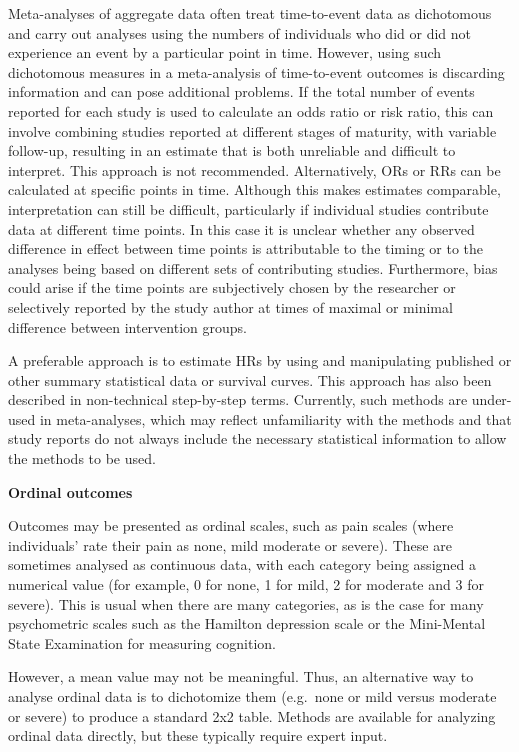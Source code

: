 \documentclass[
  10pt,
  a4paper,
  DIV=11,
  numbers=noendperiod]{scrreprt}
\begin{document}
Meta-analyses of aggregate data often treat time-to-event data as
dichotomous and carry out analyses using the numbers of individuals who
did or did not experience an event by a particular point in time.
However, using such dichotomous measures in a meta-analysis of
time-to-event outcomes is discarding information and can pose additional
problems. If the total number of events reported for each study is used
to calculate an odds ratio or risk ratio, this can involve combining
studies reported at different stages of maturity, with variable
follow-up, resulting in an estimate that is both unreliable and
difficult to interpret. This approach is not recommended. Alternatively,
ORs or RRs can be calculated at specific points in time. Although this
makes estimates comparable, interpretation can still be difficult,
particularly if individual studies contribute data at different time
points. In this case it is unclear whether any observed difference in
effect between time points is attributable to the timing or to the
analyses being based on different sets of contributing studies.
Furthermore, bias could arise if the time points are subjectively chosen
by the researcher or selectively reported by the study author at times
of maximal or minimal difference between intervention groups.

A preferable approach is to estimate HRs by using and manipulating
published or other summary statistical data or survival curves. This
approach has also been described in non-technical step-by-step terms.
Currently, such methods are under-used in meta-analyses, which may
reflect unfamiliarity with the methods and that study reports do not
always include the necessary statistical information to allow the
methods to be used.

\textbf{Ordinal outcomes}

Outcomes may be presented as ordinal scales, such as pain scales (where
individuals' rate their pain as none, mild moderate or severe). These
are sometimes analysed as continuous data, with each category being
assigned a numerical value (for example, 0 for none, 1 for mild, 2 for
moderate and 3 for severe). This is usual when there are many
categories, as is the case for many psychometric scales such as the
Hamilton depression scale or the Mini-Mental State Examination for
measuring cognition.

However, a mean value may not be meaningful. Thus, an alternative way to
analyse ordinal data is to dichotomize them (e.g.~none or mild versus
moderate or severe) to produce a standard 2x2 table. Methods are
available for analyzing ordinal data directly, but these typically
require expert input.
\end{document}
